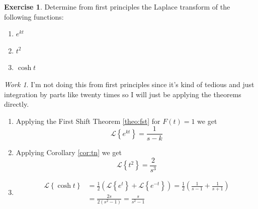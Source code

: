 \documentclass{report}
\theoremstyle{definition}
\newtheorem{exercise}{Exercise}[chapter]
\theoremstyle{remark}
\newtheorem*{work}{Work}
\newcommand{\lapt}[1]{\mathscr{L}\left\{ #1\right\}}
\begin{document}
\addtocounter{exercise}{1}
\begin{exercise}
    Determine from first principles the Laplace transform of the following functions: 
    \begin{enumerate}[label=(\alph*)]
        \item $e^{kt}$
        \item $t^2$
        \item $\cosh t$
    \end{enumerate}
\end{exercise}
\begin{work}
    I'm not doing this from first principles since it's kind of tedious and just integration by parts like twenty times so I will just be applying the theorems directly.
    \begin{enumerate} [label=(\alph*)]
        \item Applying the First Shift Theorem \ref{theo:fst} for $F(t)=1$ we get
        \begin{equation*}
            \lapt{e^{kt}} = \frac{1}{s-k}
        \end{equation*}
        \item Applying Corollary \ref{cor:tn} we get
        \begin{equation*}
            \lapt{t^2} = \frac{2}{s^3}
        \end{equation*}
        \item \begin{equation*}
        \begin{split}
            \lapt{\cosh t} &= \frac{1}{2}\left( \lapt{e^t} + \lapt{e^{-t}}\right) = \frac{1}{2} \left( \frac{1}{s-1}+\frac{1}{s+1} \right) \\
            &=\frac{2s}{2(s^2-1)} = \frac{s}{s^2-1}
        \end{split}
    \end{equation*}
    \end{enumerate}
    
\end{work}
\end{document}
